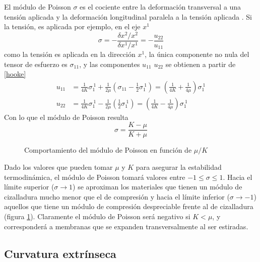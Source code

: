El módulo de Poisson $\sigma$ es el cociente entre la deformación transversal
a una tensión aplicada y la deformación longitudinal paralela a la tensión
aplicada \cite{Bowick:Libro_superficies}. Si la tensión, es aplicada por ejemplo, en el eje $x^1$
\begin{equation}
\sigma=-\frac{\delta x^2 / x^2}{\delta x^1 / x^1}=-\frac{u_{22}}{u_{11}}
\end{equation}
como la tensión es aplicada en la dirección $x^1$, la única componente no nula
del tensor de esfuerzo es $\sigma_{11}$, y las componentes $u_{11}$ $u_{22}$
se obtienen a partir de \eqref{hooke}
\begin{align}
u_{11}&=\frac{1}{4K}\sigma_1^{\
  1}+\frac{1}{2\mu}\left(\sigma_{11}-\frac{1}{2}\sigma_1^{\
    1}\right)=\left(\frac{1}{4K}+\frac{1}{4\mu}\right)\sigma_1^{\ 1}\\
u_{22}&=\frac{1}{4K}\sigma_1^{\ 1}-\frac{1}{2\mu}\left(\frac{1}{2}\sigma_1^{\
    1}\right)=\left(\frac{1}{4K}-\frac{1}{4\mu}\right)\sigma_1^{\ 1}
\end{align}
Con lo que el módulo de Poisson resulta
\begin{equation}
\sigma=\frac{K-\mu}{K+\mu}
\end{equation}
\begin{figure}[h]
\centering
 \resizebox{\columnwidth}{!}{}
\caption{Comportamiento del módulo de Poisson en función de $\mu/K$}\label{esquema_Poisson}
\end{figure} 
Dado los valores que pueden tomar $\mu$ y $K$ para asegurar la estabilidad
termodinámica, el módulo de Poisson tomará valores entre $-1\leq \sigma \leq
1$. Hacia el límite superior ($\sigma\rightarrow 1$) se aproximan los materiales que tienen un módulo
de cizalladura mucho menor que el de compresión y hacia el límite inferior ($\sigma\rightarrow -1$)
aquellos que tiene un módulo de compresión despreciable frente al de
cizalladura (figura \ref{esquema_Poisson}). Claramente el módulo de Poisson
será negativo si $K<\mu$, y corresponderá a membranas que se expanden
transversalmente al ser estiradas. 

\clearpage

\subsection{Curvatura extrínseca}

